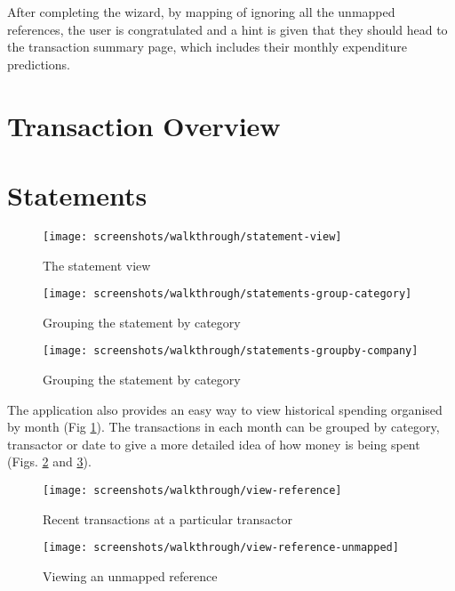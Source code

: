 After completing the wizard, by mapping of ignoring all the unmapped references, the user is congratulated and a hint is given that they should head to the transaction summary page, which includes their monthly expenditure predictions.

\section{Transaction Overview}

\section{Statements}
\begin{figure}
\centering
\texttt{[image: screenshots/walkthrough/statement-view]}
\caption{The statement view}
\label{fig:statement-view}
\end{figure}

\begin{figure}
\centering
\texttt{[image: screenshots/walkthrough/statements-group-category]}
\caption{Grouping the statement by category}
\label{fig:statements-group-category}
\end{figure}

\begin{figure}
\centering
\texttt{[image: screenshots/walkthrough/statements-groupby-company]}
\caption{Grouping the statement by category}
\label{fig:statements-groupby-company}
\end{figure}

The application also provides an easy way to view historical spending organised by month (Fig \ref{fig:statement-view}). The transactions in each month can be grouped by category, transactor or date to give a more detailed idea of how money is being spent (Figs. \ref{fig:statements-group-category} and \ref{fig:statements-groupby-company}).

\begin{figure}
\centering
\texttt{[image: screenshots/walkthrough/view-reference]}
\caption{Recent transactions at a particular transactor}
\label{fig:view-reference}
\end{figure}

\begin{figure}
\centering
\texttt{[image: screenshots/walkthrough/view-reference-unmapped]}
\caption{Viewing an unmapped reference}
\label{fig:view-reference-unmapped}
\end{figure}


